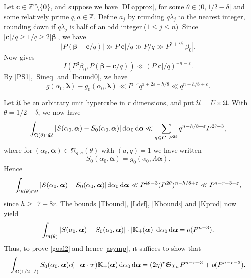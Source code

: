 \documentclass[12pt,reqno]{amsart}
\theoremstyle{definition}
\theoremstyle{remark}
\numberwithin{equation}{section}
\begin{document}
Let ${\mathbf c} \in {\mathbb Z}^n \setminus \{ {\mathbf 0} \}$, and suppose we have \eqref{DLapprox}, for some ${{\theta}} \in (0, 1/2 - {{\delta}}]$ and some relatively prime $q,a \in {\mathbb Z}$. Define $a_j$ by rounding $q {{\lambda}}_j$ to the nearest integer, rounding down if $q {{\lambda}}_j$ is half of an odd integer ($1 {\leqslant} j {\leqslant} n$). Since $|{\mathbf c}|/q {\geqslant} 1/q {\geqslant} 2|{\boldsymbol{\beta}}|$, we have
\[
|P({\boldsymbol{\beta}} - {\mathbf c}/q)| \gg P|{\mathbf c}| / q \gg P/q \gg P^{3+2 {{\delta}}} |{{\beta}}_0|.
\]
Now \cite[Lemma 10]{HB1996} gives
\begin{equation} \label{Ibound0}
I(P^3 {{\beta}}_0, P({\boldsymbol{\beta}} - {\mathbf c} / q)) \ll (P|{\mathbf c}|/q)^{-n-{\varepsilon}}.
\end{equation}
By \eqref{PS1}, \eqref{Sineq} and \eqref{Ibound0}, we have
\begin{equation} \label{PS3}
g({{\alpha}}_0,{{\boldsymbol {{\lambda}}}}) - g_0({{\alpha}}_0,{{\boldsymbol {{\lambda}}}}) \ll P^{-{\varepsilon}} q^{n+2{\varepsilon} - h/8} \ll q^{n - h/8 + {\varepsilon}}.
\end{equation}

Let ${\mathfrak U}$ be an arbitrary unit hypercube in $r$ dimensions, and put ${\mathcal U} = U \times {\mathfrak U}$. With ${{\theta}} = 1/2 - {{\delta}}$, we now have
\[
\int_{{\mathfrak N}({{\theta}}) \cap {\mathcal U}} |S({{\alpha}}_0,{\boldsymbol{{\alpha}}}) - S_0({{\alpha}}_0,{\boldsymbol{{\alpha}}})| {{\,{\rm d}}} {{\alpha}}_0 {{\,{\rm d}}} {\boldsymbol{{\alpha}}}
\ll \sum_{q {\leqslant} C_1 P^{2{{\theta}}}} q^{n - h/8 + {\varepsilon}} P^{2{{\theta}} - 3},
\]
where for $({{\alpha}}_0,{\boldsymbol{{\alpha}}}) \in {\mathfrak N}_{q,a}({{\theta}})$ with $(a,q)=1$ we have written 
\[
S_0({{\alpha}}_0,{\boldsymbol{{\alpha}}}) = g_0({{\alpha}}_0, {{\Lambda}} {\boldsymbol{{\alpha}}}).
\]
Hence
\[
\int_{{\mathfrak N}({{\theta}}) \cap {\mathcal U}} |S({{\alpha}}_0,{\boldsymbol{{\alpha}}}) - S_0({{\alpha}}_0,{\boldsymbol{{\alpha}}})| {{\,{\rm d}}} {{\alpha}}_0 {{\,{\rm d}}} {\boldsymbol{{\alpha}}}
\ll P^{4{{\theta}} - 3} (P^{2{{\theta}}})^{n-h/8 + {\varepsilon}} \ll P^{n-r-3-{\varepsilon}},
\]
since $h {\geqslant} 17 + 8r$. The bounds \eqref{Tbound}, \eqref{Ldef}, \eqref{Kbounds} and \eqref{Kprod} now yield
\[
\int_{{\mathfrak N}({{\theta}})} |S({{\alpha}}_0,{\boldsymbol{{\alpha}}}) - S_0({{\alpha}}_0,{\boldsymbol{{\alpha}}})| \cdot |{\mathbb K}_\pm({\boldsymbol{{\alpha}}})| {{\,{\rm d}}} {{\alpha}}_0 {{\,{\rm d}}} {\boldsymbol{{\alpha}}} = o(P^{n-3}).
\]
Thus, to prove \eqref{goal2} and hence \eqref{asymp}, it suffices to show that
\begin{equation} \label{goal3}
\int_{{\mathfrak N}(1/2-{{\delta}})} S_0({{\alpha}}_0,{\boldsymbol{{\alpha}}}) e(-{\boldsymbol{{\alpha}}} \cdot {\boldsymbol{\tau}}) {\mathbb K}_\pm({\boldsymbol{{\alpha}}}) {{\,{\rm d}}} {{\alpha}}_0 {{\,{\rm d}}} {\boldsymbol{{\alpha}}} 
= (2 \eta)^r {\mathfrak S} \chi_w P^{n-r-3} + o(P^{n-r-3}).
\end{equation}
\end{document}
